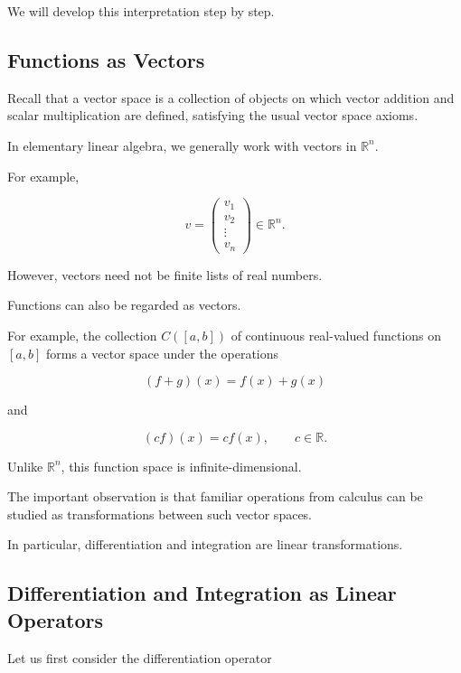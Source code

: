 \documentclass[11pt,a4paper]{article}
\theoremstyle{definition}
\theoremstyle{remark}
\begin{document}
\medskip

We will develop this interpretation
step by step.

\subsection{Functions as Vectors}

Recall that a vector space is a
collection of objects on which
vector addition and scalar
multiplication are defined,
satisfying the usual vector
space axioms.

In elementary linear algebra,
we generally work with vectors
in $\mathbb{R}^n$.

For example,

\[
    v=
    \begin{pmatrix}
        v_1\\
        v_2\\
        \vdots\\
        v_n
    \end{pmatrix}
    \in\mathbb{R}^n.
\]

However, vectors need not be
finite lists of real numbers.

Functions can also be regarded
as vectors.

For example, the collection
$C([a,b])$ of continuous
real-valued functions on
$[a,b]$ forms a vector space
under the operations

\[
    (f+g)(x)=f(x)+g(x)
\]

and

\[
    (cf)(x)=cf(x),
    \qquad c\in\mathbb{R}.
\]

Unlike $\mathbb{R}^n$,
this function space is
infinite-dimensional.

The important observation
is that familiar operations
from calculus can be studied
as transformations between
such vector spaces.

In particular, differentiation
and integration are linear
transformations.

\subsection{Differentiation and Integration
as Linear Operators}

Let us first consider the
differentiation operator
\end{document}
